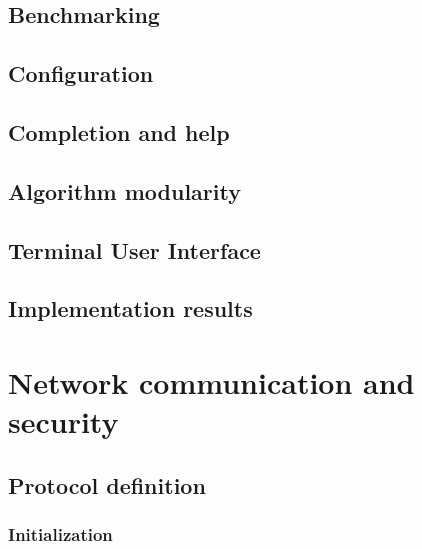 \section{Benchmarking}
\label{sec:cmd_benchmark}


\section{Configuration}
\label{sec:cmd_config}


\section{Completion and help}
\label{sec:cmd_help}


\section{Algorithm modularity}
\label{sec:algs_modularity}


\section{Terminal User Interface}
\label{sec:tui}


\section{Implementation results}
\label{sec:lattice_performance_measuring}


\chapter{Network communication and security}
\label{ch:network_com_sec}


\section{Protocol definition}
\label{sec:protocol_def}


\subsection{Initialization}
\label{subsec:init_phase}


